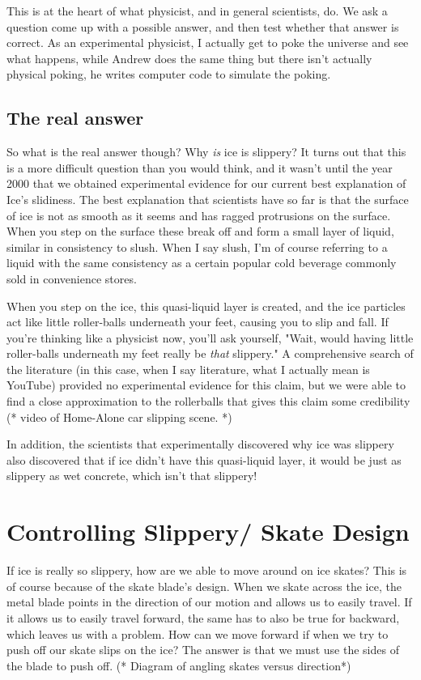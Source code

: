 \documentclass[12pt]{article}
\begin{document}
This is at the heart of what physicist, and in general scientists, do. We ask 
a question come up with a possible answer, and then test whether that answer is
correct. As an experimental physicist, I actually get to poke the universe and
see what happens, while Andrew does the same thing but there isn't actually 
physical poking, he writes computer code to simulate the poking. 

\subsection{The real answer}
So what is the real answer though? Why \emph{is} ice is slippery? 
It turns out that this is a more difficult question than you would think, and
it wasn't until the year 2000 that we obtained experimental evidence for our 
current best explanation of Ice's slidiness. The best explanation that 
scientists have so far is that the surface of ice is not as smooth as it seems and
has ragged protrusions on the surface. When you step on the surface these break off and 
form a small layer of liquid, similar in consistency to slush. When I say slush, I'm 
of course referring to a liquid with the same consistency as a certain popular
cold beverage commonly sold in convenience stores. 

When you step on the ice,  this quasi-liquid layer is created, and the ice particles 
act like little roller-balls underneath your feet, causing you to slip and fall. 
If you're thinking like a physicist now, you'll ask yourself, "Wait, would having
little roller-balls underneath my feet really be \emph{that} slippery." A 
comprehensive search of the literature (in this case, when I say literature, 
what I actually mean is YouTube) provided no experimental 
evidence for this claim, but we were able to find a close approximation to 
the rollerballs that gives this claim some credibility (* video of Home-Alone
car slipping scene. *) 

In addition, the scientists that experimentally discovered why ice was slippery 
also discovered that if ice didn't have this quasi-liquid layer, it would be 
just as slippery as wet concrete, which 
isn't that slippery!

\section{Controlling Slippery/ Skate Design}
If ice is really so slippery, how are we able to move around on ice skates? This is 
of course because of the skate blade's design. When we skate across the ice, the metal blade
points in the direction of our motion and allows us to easily travel. If it allows us to easily 
travel forward, the same has to also be true for backward, which leaves us with a problem. 
How can we move forward if when we try to push off our skate slips on the ice? The answer
is that we must use the sides of the blade to push off. (* Diagram of angling skates versus 
direction*) 
\end{document}
